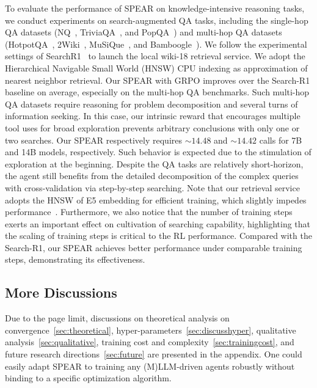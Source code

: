 \documentclass[]{youtu} %
\newcommand{\method}{\textsc{SPEAR}\xspace}
\begin{document}
{To evaluate the performance of \method on knowledge-intensive reasoning tasks,
we conduct experiments on search-augmented QA tasks,
including the single-hop QA datasets (NQ~\cite{kwiatkowski2019natural},
TriviaQA~\cite{joshi2017triviaqa},
and PopQA~\cite{mallen2023not}) and multi-hop QA datasets (HotpotQA~\cite{yang2018hotpotqa},
2Wiki~\cite{ho2020constructing},
MuSiQue~\cite{trivedi2022musique},
and Bamboogle~\cite{press2023measuring}).
We follow the experimental settings of SearchR1~\cite{jin2025search,gao2025beyond} to launch the local wiki-18 retrieval service.
We adopt the Hierarchical Navigable Small World (HNSW) CPU indexing as approximation of nearest neighbor retrieval.
Our \method with GRPO improves over the Search-R1 baseline on average,
especially on the multi-hop QA benchmarks.
Such multi-hop QA datasets require reasoning for problem decomposition and several turns of information seeking.
In this case, our intrinsic reward that encourages multiple tool uses for broad exploration prevents arbitrary conclusions with only one or two searches.
Our \method respectively requires $\sim14.48$ and $\sim14.42$ calls for 7B and 14B models, respectively.
Such behavior is expected due to the stimulation of exploration at the beginning.
Despite the QA tasks are relatively short-horizon,
the agent still benefits from the detailed decomposition of the complex queries with cross-validation via step-by-step searching.
Note that our retrieval service adopts the HNSW of E5 embedding for efficient training,
which slightly impedes performance~\cite{jin2025empirical}.
Furthermore, we also notice that the number of training steps exerts an important effect on cultivation of searching capability,
highlighting that the scaling of training steps is critical to the RL performance.
Compared with the Search-R1,
our \method achieves better performance under comparable training steps,
demonstrating its effectiveness.
}





\subsection{More Discussions}
\label{sec:discussionintotal}

Due to the page limit,
discussions on 
theoretical analysis on convergence~\ref{sec:theoretical},
hyper-parameters~\ref{sec:discusshyper},
qualitative analysis~\ref{sec:qualitative},
training cost and complexity~\ref{sec:trainingcost},
and future research directions~\ref{sec:future} are presented in the appendix.
One could easily adapt \method to training any (M)LLM-driven agents robustly without binding to a specific optimization algorithm. 
\end{document}

